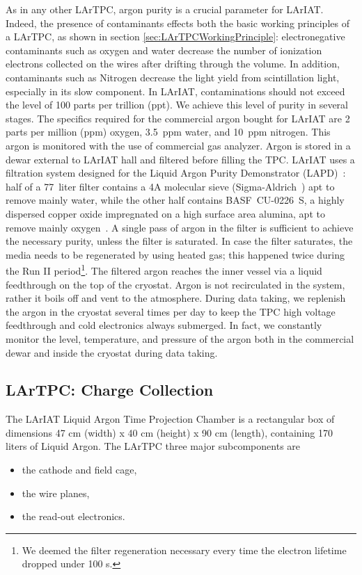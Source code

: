 As in any other LArTPC, argon purity is a crucial parameter for LArIAT. Indeed, the presence of contaminants effects both the basic working principles of a LArTPC, as shown in section \ref{sec:LArTPCWorkingPrinciple}: electronegative contaminants such as oxygen and water decrease the number of ionization electrons collected on the wires after drifting through the volume. In addition, contaminants such as Nitrogen decrease the light yield from scintillation light, especially in its slow component.
In LArIAT, contaminations should not exceed the level of 100 parts per trillion (ppt). We achieve this level of purity in several stages. The specifics required for the commercial argon bought for LArIAT are 2 parts per million (ppm) oxygen, 3.5~ppm water, and 10~ppm nitrogen. This argon is monitored with the use of commercial gas analyzer.
Argon is stored in a dewar external to LArIAT hall and filtered before filling the TPC. %
LArIAT uses a filtration system designed for the Liquid Argon Purity Demonstrator (LAPD)~\cite{LAPD}: half of a 77~liter filter contains a 4A molecular sieve (Sigma-Aldrich~\cite{sigma-aldrich}) apt to remove mainly water, while the other half contains BASF~CU-0226~S, a highly dispersed copper oxide impregnated on a high surface area alumina, apt to remove mainly oxygen~\cite{basf}. A single pass of argon in the filter is sufficient to achieve the necessary purity, unless the filter is saturated. In case the filter saturates, the media needs to be regenerated by using heated gas; this happened twice during the Run II period\footnote{We deemed the filter regeneration necessary every time the electron lifetime dropped under 100 \textmu s.}.
The filtered argon reaches the inner vessel via a liquid feedthrough on the top of the cryostat. Argon is not recirculated in the system, rather it boils off and vent to the atmosphere. During data taking, we replenish the argon in the cryostat several times per day to keep the TPC high voltage feedthrough and cold electronics always submerged. In fact, we constantly monitor the level, temperature, and pressure of the argon both in the commercial dewar and inside the cryostat during data taking. 
\subsection{LArTPC: Charge Collection}\label{sec:TPCCharge}
The LArIAT Liquid Argon Time Projection Chamber is a rectangular box of dimensions 47 cm (width) x 40 cm (height) x 90 cm (length), containing 170 liters of Liquid Argon.
The LArTPC three major subcomponents are 
\begin{itemize} 
\item[1)] the cathode and field cage,
\item [2)] the wire planes, 
\item [3)] the read-out electronics. %
\end{itemize}



